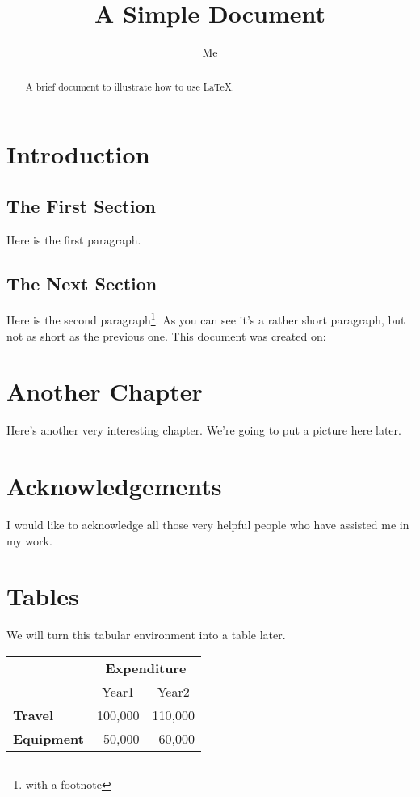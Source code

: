 \documentclass[12pt]{}
\title{A Simple Document}
\author{Me}
\begin{document}
\maketitle

\tableofcontents

\begin{abstract}
A brief document to illustrate how to use \LaTeX.
\end{abstract}

\chapter{Introduction}

\section{The First Section}

Here is the first paragraph.

\section{The Next Section}

Here is the second paragraph\footnote{with a footnote}.
As you can see it's a rather short paragraph, but not
as short as the previous one. This document was
created on:

\chapter{Another Chapter}

Here's another very interesting chapter.
We're going to put a picture here later.

\chapter*{Acknowledgements}

I would like to acknowledge all those
very helpful people who have assisted
me in my work.

\appendix
\chapter{Tables}

We will turn this tabular environment into a table later.

\begin{tabular}{lrr}
 & \multicolumn{2}{c}{\bfseries Expenditure}\\
 & \multicolumn{1}{c}{Year1} & \multicolumn{1}{c}{Year2}\\
\bfseries Travel & 100,000 & 110,000\\
\bfseries Equipment & 50,000 & 60,000
\end{tabular}
\end{document}
